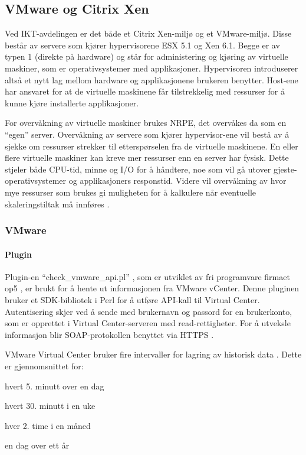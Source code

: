 \subsection{VMware og Citrix Xen}
Ved IKT-avdelingen er det både et Citrix Xen-miljø og et VMware-miljø. Disse består av servere som kjører hypervisorene ESX 5.1 og Xen 6.1. Begge er av typen 1 (direkte på hardware) og står for administering og kjøring av virtuelle maskiner, som er operativsystemer med applikasjoner. Hypervisoren introduserer altså et nytt lag mellom hardware og applikasjonene brukeren benytter. Host-ene har ansvaret for at de virtuelle maskinene får tilstrekkelig med ressurser for å kunne kjøre installerte applikasjoner. 

For overvåkning av virtuelle maskiner brukes NRPE, det overvåkes da som en ``egen'' server. Overvåkning av servere som kjører hypervisor-ene vil bestå av å sjekke om ressurser strekker til etterspørselen fra de virtuelle maskinene. En eller flere virtuelle maskiner kan kreve mer ressurser enn en server har fysisk. Dette stjeler både CPU-tid, minne og I/O for å håndtere, noe som vil gå utover gjeste-operativsystemer og applikasjoners responstid. Videre vil overvåkning av hvor mye ressurser som brukes gi muligheten for å kalkulere når eventuelle skaleringstiltak må innføres \cite{vmwaremonitoring}.

\subsubsection{VMware}
\paragraph{Plugin}
Plugin-en ``check\_vmware\_api.pl'' , som er utviklet av fri programvare firmaet op5 \cite{op5}, er brukt for å hente ut informasjonen fra VMware vCenter. Denne pluginen bruker et SDK-bibliotek i Perl \cite{vmwareperl} for å utføre API-kall til Virtual Center. Autentisering skjer ved å sende med brukernavn og passord for en brukerkonto, som er opprettet i Virtual Center-serveren med read-rettigheter. For å utveksle informasjon blir SOAP-protokollen benyttet \cite{wiki:soap} via HTTPS \cite{ciscovirtual}.

VMware Virtual Center bruker fire intervaller for lagring av historisk data \cite{vmwareperf}. Dette er gjennomsnittet for:
\begin{enumerate*}
        \item hvert 5. minutt over en dag
        \item hvert 30. minutt i en uke
        \item hver 2. time i en måned
        \item en dag over ett år
\end{enumerate*}

